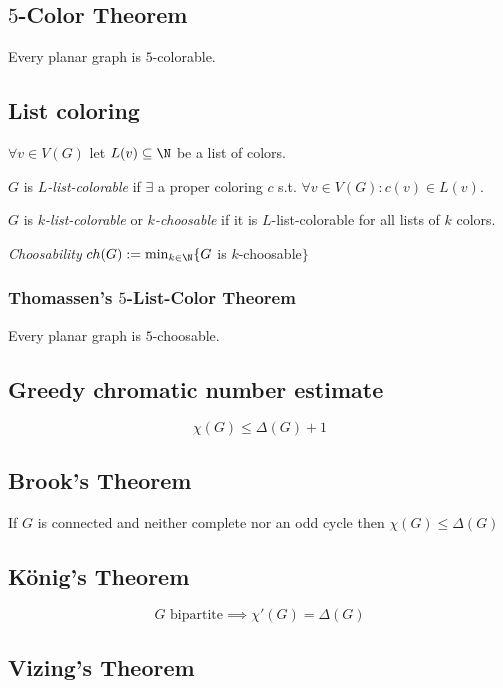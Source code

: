 \subsection*{$5$-Color Theorem}

Every planar graph is $5$-colorable.

\subsection*{List coloring}

$\forall v \in V(G)$ let $L(v) \subseteq \N$ be a list of colors.

$G$ is \emph{$L$-list-colorable} if $\exists$ a proper coloring $c$ s.t. $\forall v \in V(G) : c(v) \in L(v)$.

\spacing

$G$ is \emph{$k$-list-colorable} or \emph{$k$-choosable} if it is $L$-list-colorable for all lists of $k$ colors.

\spacing

\emph{Choosability} $ch(G) := \min_{k\in\N}\{ G$ is $k$-choosable$\}$

\subsubsection*{Thomassen's $5$-List-Color Theorem}

Every planar graph is $5$-choosable.

\subsection*{Greedy chromatic number estimate}

\[ \chi(G) \leq \Delta(G)+1 \]

\subsection*{Brook's Theorem}

If $G$ is connected and neither complete nor an odd cycle then $\chi(G) \leq \Delta(G)$

\subsection*{König's Theorem}

\[ G \text{ bipartite} \implies \chi'(G) = \Delta(G) \]

\subsection*{Vizing's Theorem}

